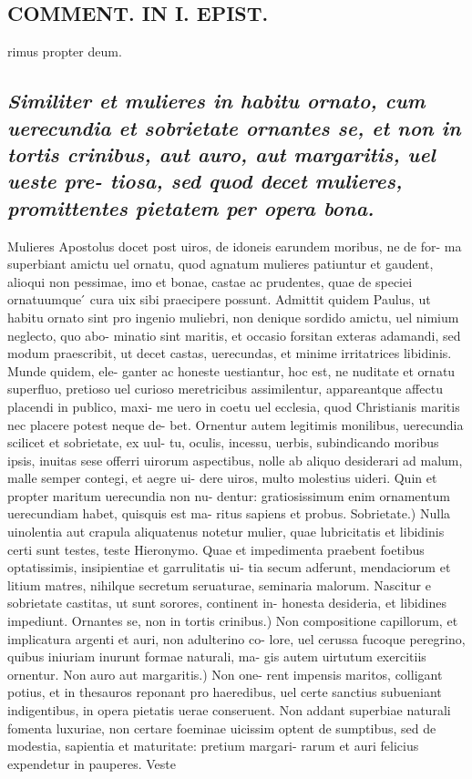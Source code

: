 \documentclass{article}
\begin{document}
\begin{pages}
\section*{COMMENT. IN I. EPIST. }
\marginpar{[ p.486 ]}\pstart rimus propter deum.  \pend
{}
{}
\subsection*{\textit{Similiter et mulieres in habitu ornato, cum uerecundia et sobrietate ornantes se, et non in tortis crinibus, aut auro, aut margaritis, uel ueste pre- tiosa, sed quod decet mulieres, promittentes pietatem per opera bona. }}\pstart Mulieres Apostolus docet post uiros, de idoneis earundem moribus, ne de for- ma superbiant amictu uel ornatu, quod agnatum mulieres patiuntur et gaudent, alioqui non pessimae, imo et bonae, castae ac prudentes, quae de speciei ornatuumque ́ cura uix sibi praecipere possunt. Admittit quidem Paulus, ut habitu ornato sint pro ingenio muliebri, non denique sordido amictu, uel nimium neglecto, quo abo- minatio sint maritis, et occasio forsitan exteras adamandi, sed modum praescribit, ut decet castas, uerecundas, et minime irritatrices libidinis. Munde quidem, ele- ganter ac honeste uestiantur, hoc est, ne nuditate et ornatu superfluo, pretioso uel curioso meretricibus assimilentur, appareantque affectu placendi in publico, maxi- me uero in coetu uel ecclesia, quod Christianis maritis nec placere potest neque de- bet. Ornentur autem legitimis monilibus, uerecundia scilicet et sobrietate, ex uul- tu, oculis, incessu, uerbis, subindicando moribus ipsis, inuitas sese offerri uirorum aspectibus, nolle ab aliquo desiderari ad malum, malle semper contegi, et aegre ui- dere uiros, multo molestius uideri. Quin et propter maritum uerecundia non nu- dentur: gratiosissimum enim ornamentum uerecundiam habet, quisquis est ma- ritus sapiens et probus. Sobrietate.) Nulla uinolentia aut crapula aliquatenus notetur mulier, quae lubricitatis et libidinis certi sunt testes, teste Hieronymo. Quae et impedimenta praebent foetibus optatissimis, insipientiae et garrulitatis ui- tia secum adferunt, mendaciorum et litium matres, nihilque secretum seruaturae, seminaria malorum. Nascitur e sobrietate castitas, ut sunt sorores, continent in- honesta desideria, et libidines impediunt. Ornantes se, non in tortis crinibus.) Non compositione capillorum, et implicatura argenti et auri, non adulterino co- lore, uel cerussa fucoque peregrino, quibus iniuriam inurunt formae naturali, ma- gis autem uirtutum exercitiis ornentur. Non auro aut margaritis.) Non one- rent impensis maritos, colligant potius, et in thesauros reponant pro haeredibus, uel certe sanctius subueniant indigentibus, in opera pietatis uerae conseruent. Non addant superbiae naturali fomenta luxuriae, non certare foeminae uicissim optent de sumptibus, sed de modestia, sapientia et maturitate: pretium margari- rarum et auri felicius expendetur in pauperes. Veste 
\end{pages}
\end{document}
